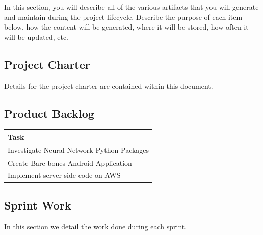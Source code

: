 In this section, you will describe all of the various artifacts that you will generate and maintain during the project lifecycle. Describe the purpose of each item below, how the content will be generated, where it will be stored, how often it will be updated, etc. 

\subsection{Project Charter}
Details for the project charter are contained within this document.

\subsection{Product Backlog}
\begin{table}[htbp]
    \centering
    \begin{tabularx}{\textwidth}{l}
        Task\\
        \hline
        Investigate Neural Network Python Packages\\
        Create Bare-bones Android Application\\
        Implement server-side code on AWS\\
    \end{tabularx}
\end{table}

\subsection{Sprint Work}
In this section we detail the work done during each sprint.
















